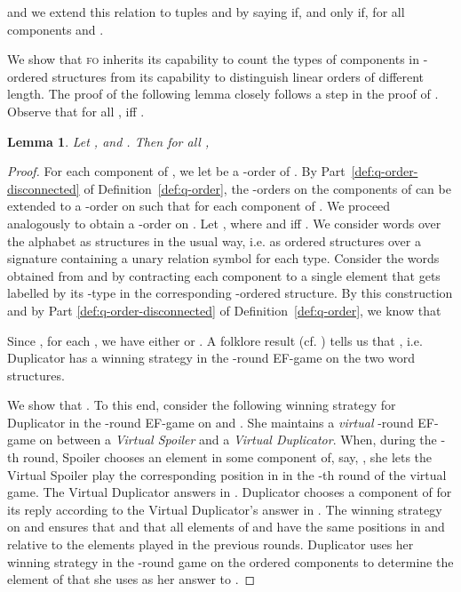 \documentclass[11pt]{article}
\newtheorem{lemma}[theorem]{Lemma}
\newcommand{\logic}[1]{\textsc{#1}}
\newcommand{\FO}{\logic{fo}}
\begin{document}
and we extend this relation to tuples  and  by saying
 if, and only if,  for
all components  and .

We show that \FO{} inherits its capability to count the types of
components in -ordered structures from its capability to
distinguish linear orders of different length.  The proof of the
following lemma closely follows a step in the proof of
\cite[Thm. 5.5]{BenediktSegoufin2009}.
Observe that for all , 
 iff 
. 

\begin{lemma}
  \label{lem:cut-determines-type}
  Let ,  and . Then for all , 
  
\end{lemma}
\begin{proof}
  For each component  of , we let  be a
  -order of .
  By Part~\ref{def:q-order-disconnected} of Definition~\ref{def:q-order},
  the -orders on the components of  can be extended to a -order
   on  such that
   for each component  of
  . We proceed analogously to obtain a -order  on
  .  Let ,
  where  and 
  iff .
  We consider words over the alphabet  as structures in the usual way,
  i.e. as ordered structures over a signature containing a unary relation symbol for each type.
  Consider the words  obtained from  and
   by contracting each component  to a single
  element that gets labelled by its -type in the corresponding
  -ordered structure.
  By this construction and by Part \ref{def:q-order-disconnected} of
  Definition~\ref{def:q-order}, we know that 
  
  Since , for each , we have either
   or
  . A folklore result
  (cf. \cite[Ch. 3]{Libkin2004}) tells us that , i.e. Duplicator has a winning strategy in the -round
  EF-game on the two word structures.

  We show that .  To
  this end, consider the following winning strategy for Duplicator in
  the -round EF-game on  and
  . She maintains a \emph{virtual} -round
  EF-game  on  between a \emph{Virtual Spoiler} and
  a \emph{Virtual Duplicator}. When, during the -th round, Spoiler
  chooses an element  in some component  of, say, , she
  lets the Virtual Spoiler play the corresponding position in
   in the -th round of the virtual game. The Virtual
  Duplicator answers in . Duplicator chooses a component
   of  for its reply according to the Virtual Duplicator's
  answer in . The winning strategy on  and 
  ensures that  and
  that all elements of  and  have the same positions in
   and  relative to the elements played in
  the previous rounds. Duplicator uses her winning strategy in the
  -round game on the ordered components to determine the element of
   that she uses as her answer to .
\end{proof}
\end{document}

